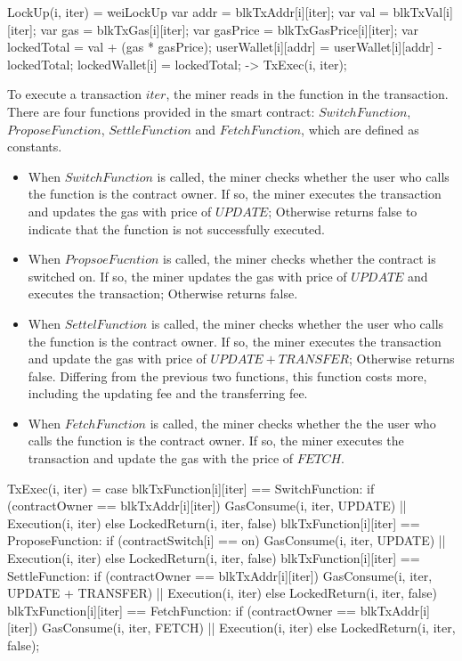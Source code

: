 \documentclass{KERauth}
\begin{document}
\begin{center}
\begin{boxedverbatim}
LockUp(i, iter) =
  weiLockUp{
    var addr = blkTxAddr[i][iter];
    var val = blkTxVal[i][iter];
    var gas = blkTxGas[i][iter];
    var gasPrice = blkTxGasPrice[i][iter];
    var lockedTotal = val + (gas * gasPrice);
    userWallet[i][addr] = userWallet[i][addr] - lockedTotal;
    lockedWallet[i] = lockedTotal;} ->
  TxExec(i, iter);
\end{boxedverbatim}
\end{center}

To execute a transaction $iter$, the miner reads in the function in the transaction. There are four functions provided in the smart contract: $SwitchFunction$, $ProposeFunction$, $SettleFunction$ and $FetchFunction$, which are defined as constants.
\begin{itemize}
    \item When $SwitchFunction$ is called, the miner checks whether the user who calls the function is the contract owner. If so, the miner executes the transaction and updates the gas with price of $UPDATE$; Otherwise returns false to indicate that the function is not successfully executed.
    \item When $PropsoeFucntion$ is called, the miner checks whether the contract is switched on. If so, the miner updates the gas with price of $UPDATE$ and executes the transaction; Otherwise returns false.
    \item When $SettelFunction$ is called, the miner checks whether the user who calls the function is the contract owner. If so, the miner executes the transaction and update the gas with price of $UPDATE + TRANSFER$; Otherwise returns false. Differing from the previous two functions, this function costs more, including the updating fee and the transferring fee.
    \item When $FetchFunction$ is called, the miner checks whether the the user who calls the function is the contract owner. If so, the miner executes the transaction and update the gas with the price of $FETCH$.
\end{itemize}

\begin{center}
\begin{boxedverbatim}
TxExec(i, iter) =
  case {
    blkTxFunction[i][iter] == SwitchFunction:
      if (contractOwner == blkTxAddr[i][iter]) {
        GasConsume(i, iter, UPDATE) || Execution(i, iter)}
      else { LockedReturn(i, iter, false) }
    blkTxFunction[i][iter] == ProposeFunction:
      if (contractSwitch[i] == on) {
        GasConsume(i, iter, UPDATE) || Execution(i, iter)}
      else {LockedReturn(i, iter, false)}
    blkTxFunction[i][iter] == SettleFunction:
      if (contractOwner == blkTxAddr[i][iter]) {
        GasConsume(i, iter, UPDATE + TRANSFER) || Execution(i, iter)}
      else {LockedReturn(i, iter, false)}
    blkTxFunction[i][iter] == FetchFunction:
      if (contractOwner == blkTxAddr[i][iter]) {
        GasConsume(i, iter, FETCH) || Execution(i, iter)}
      else {LockedReturn(i, iter, false)}};
\end{boxedverbatim}
\end{center}
\end{document}
